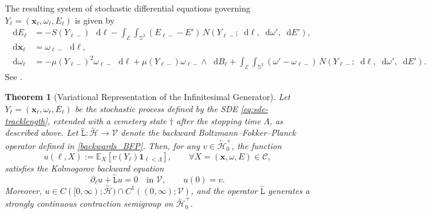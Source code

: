\documentclass{amsart}
\newcommand{\bL}{\stackrel{_\leftarrow}{\mathtt L}}
\theoremstyle{plain}
\newtheorem{theorem}{Theorem}[section]
\renewcommand{\vec}[1]{\ensuremath{\boldsymbol{#1}}}
\newcommand{\cbH}{\stackrel{_\leftarrow}{\mathscr H}}
\newcommand{\cV}{\ensuremath{\mathscr V}}
\renewcommand{\d}{\mathop{}\!\mathrm{d}}
\begin{document}
The resulting system of stochastic differential equations governing
$Y_\ell = (\vec{x}_\ell, \omega_\ell, E_\ell)$ is given by
\begin{equation}
\label{eq:sde-tracklength}
\begin{split}
  \d E_\ell 
  &= 
  -S(Y_{\ell-}) \, \d \ell 
  - \int_{\mathcal{E}} \int_{\mathbb{S}^2} (E_{\ell-} - E') \, N(Y_{\ell-}; \d\ell, \d\omega', \d E'), \\
  \d \vec{x}_\ell 
  &= 
  \omega_{\ell-} \, \d \ell, \\
  \d \omega_\ell 
  &= 
  -\mu(Y_{\ell-})^2 \omega_{\ell-} \, \d \ell 
  + \mu(Y_{\ell-}) \omega_{\ell-} \wedge \d B_\ell 
  + \int_{\mathcal{E}} \int_{\mathbb{S}^2} (\omega' - \omega_{\ell-}) \, N(Y_{\ell-}; \d\ell, \d\omega', \d E').
\end{split}
\end{equation}
See \cite{protonbeam}.
\begin{theorem}[Variational Representation of the Infinitesimal Generator]\label{C0}
  Let $Y_\ell = (\vec{x}_\ell, \omega_\ell, E_\ell)$ be the stochastic
  process defined by the SDE \eqref{eq:sde-tracklength}, extended with
  a cemetery state $\dagger$ after the stopping time $\Lambda$, as
  described above. Let $\bL: \cbH \to \cV$ denote the backward
  Boltzmann--Fokker--Planck operator defined in
  \eqref{backwards_BFP}. Then, for any $v \in \cbH_0^+$, the function
  \begin{equation}
    u(\ell,X) := \mathbb{E}_{X} [v(Y_\ell)\mathbf{1}_{\ell < \Lambda}], \qquad \forall X = (\vec{x}, \omega, E) \in \mathcal{C},
    \label{semigroupu}
  \end{equation}
  satisfies the Kolmogorov backward equation
  \begin{equation}
    \partial_\ell u + \bL u = 0 \quad \text{in } \cV, \qquad u(0) = v.
  \end{equation}
  Moreover, $u \in C([0, \infty); \cbH) \cap C^1((0, \infty); \cV)$,
    and the operator $\bL$ generates a strongly continuous contraction
    semigroup on $\cbH_0^+$.
\end{theorem}
\end{document}
